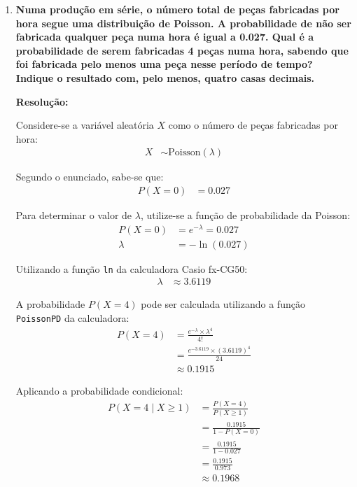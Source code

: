 \documentclass[a4paper,12pt]{article}
\begin{document}
\begin{enumerate}
  \item \textbf{Numa produção em série, o número total de peças fabricadas por hora segue uma distribuição de Poisson. A probabilidade de não ser fabricada qualquer peça numa hora é igual a 0.027. Qual é a probabilidade de serem fabricadas 4 peças numa hora, sabendo que foi fabricada pelo menos uma peça nesse período de tempo? Indique o resultado com, pelo menos, quatro casas decimais.}

  \vspace{0.3cm}

  \begin{mdframed}[backgroundcolor=gray!10, linewidth=0pt, innertopmargin=10pt, innerbottommargin=10pt]
  \textbf{Resolução:}
  
  Considere-se a variável aleatória $X$ como o número de peças fabricadas por hora:
  \begin{align*}
      X &\sim \text{Poisson}(\lambda)
  \end{align*}
  
  Segundo o enunciado, sabe-se que:
  \begin{align*}
      P(X = 0) &= 0.027
  \end{align*}

  Para determinar o valor de $\lambda$, utilize-se a função de probabilidade da Poisson:
  \begin{align*}
      P(X = 0) &= e^{-\lambda} = 0.027 \\
      \lambda &= -\ln(0.027)
  \end{align*}
  
  Utilizando a função \texttt{ln} da calculadora Casio fx-CG50:
  \begin{align*}
      \lambda &\approx 3.6119
  \end{align*}

  A probabilidade $P(X = 4)$ pode ser calculada utilizando a função \texttt{PoissonPD} da calculadora:
  \begin{align*}
      P(X = 4) &= \frac{e^{-\lambda} \times \lambda^4}{4!} \\
      &= \frac{e^{-3.6119} \times (3.6119)^4}{24} \\
      &\approx 0.1915
  \end{align*}

  Aplicando a probabilidade condicional:
  \begin{align*}
      P(X = 4 \mid X \geq 1) &= \frac{P(X = 4)}{P(X \geq 1)} \\
      &= \frac{0.1915}{1 - P(X = 0)} \\
      &= \frac{0.1915}{1 - 0.027} \\
      &= \frac{0.1915}{0.973} \\
      &\approx 0.1968
  \end{align*}


\end{mdframed}
\end{enumerate}
\end{document}
